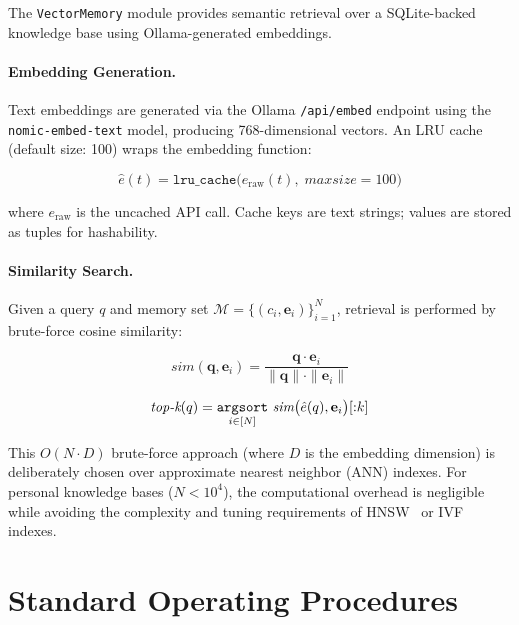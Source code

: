 \documentclass[9pt,twocolumn,letterpaper]{extarticle}
\begin{document}
The \texttt{VectorMemory} module provides semantic retrieval over a SQLite-backed knowledge base using Ollama-generated embeddings.

\paragraph{Embedding Generation.}
Text embeddings are generated via the Ollama \texttt{/api/embed} endpoint using the \texttt{nomic-embed-text} model, producing 768-dimensional vectors.
An LRU cache (default size: 100) wraps the embedding function:

\begin{equation}
\hat{e}(t) = \texttt{lru\_cache}\bigl(e_{\text{raw}}(t),\;\textit{maxsize}{=}100\bigr)
\end{equation}

\noindent where $e_{\text{raw}}$ is the uncached API call.
Cache keys are text strings; values are stored as tuples for hashability.

\paragraph{Similarity Search.}
Given a query $q$ and memory set $\mathcal{M} = \{(c_i, \mathbf{e}_i)\}_{i=1}^N$, retrieval is performed by brute-force cosine similarity:

\begin{equation}
\textit{sim}(\mathbf{q}, \mathbf{e}_i) = \frac{\mathbf{q} \cdot \mathbf{e}_i}{\|\mathbf{q}\| \cdot \|\mathbf{e}_i\|}
\label{eq:cosine}
\end{equation}

\begin{equation}
\textit{top\text{-}k}(q) = \underset{i \in [N]}{\texttt{argsort}}\ \textit{sim}\bigl(\hat{e}(q), \mathbf{e}_i\bigr)[{:}k]
\label{eq:topk}
\end{equation}

This $O(N \cdot D)$ brute-force approach (where $D$ is the embedding dimension) is deliberately chosen over approximate nearest neighbor (ANN) indexes.
For personal knowledge bases ($N < 10^4$), the computational overhead is negligible while avoiding the complexity and tuning requirements of HNSW~\cite{malkov2018hnsw} or IVF indexes.

\section{Standard Operating Procedures}
\label{sec:sops}
\end{document}
